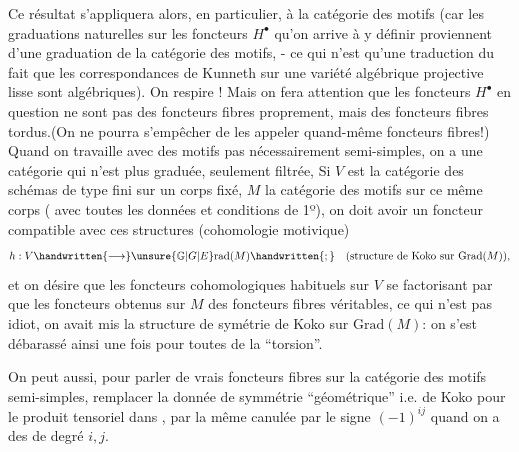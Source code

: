  Ce résultat s'appliquera alors, en particulier, à la catégorie des motifs (car les  graduations naturelles sur les foncteurs $H^\bullet$ qu'on arrive à y définir  proviennent d'une graduation de la catégorie des motifs, - ce qui n'est qu'une traduction du fait que les correspondances de Kunneth sur une variété algébrique projective lisse sont algébriques). On respire ! Mais on fera attention que les foncteurs $H^\bullet$ en question ne sont pas des foncteurs fibres proprement, mais des foncteurs fibres tordus.(On ne pourra s'empêcher de les appeler quand-même foncteurs fibres!) Quand on travaille avec des motifs pas nécessairement
semi-simples, on a une catégorie qui n'est plus graduée, seulement filtrée,  Si $V$ est la catégorie des schémas de type fini sur un corps fixé, $M$ la catégorie des motifs sur ce même corps ( avec toutes les données et conditions de 1º)\handwritten{\deleted{\unsure{(}}}, on doit avoir un foncteur  compatible avec ces structures  (cohomologie motivique)
\[
h:V\handwritten{\longrightarrow}\unsure{\mathbb{G}|G|E}\mathrm{rad}(M)\handwritten{;}\quad\text{(structure de Koko sur }\mathrm{Grad}(M)\text{)},
\]
et on désire que les foncteurs cohomologiques habituels sur $V$ se factorisant par  que les foncteurs  obtenus sur $M$  des foncteurs fibres  véritables, ce qui n'est pas idiot,  on avait mis la structure de symétrie de Koko sur $\mathrm{Grad}(M)$: on s'est débarassé ainsi une fois pour toutes de la ``torsion''.

On peut aussi, pour parler de vrais foncteurs fibres sur la catégorie des motifs semi-simples, remplacer la donnée de symmétrie ``géométrique'' i.e. de Koko pour le produit tensoriel dans , par la même canulée par le signe $(-1)^{ij}$ quand on a des  de degré $i,j$.

